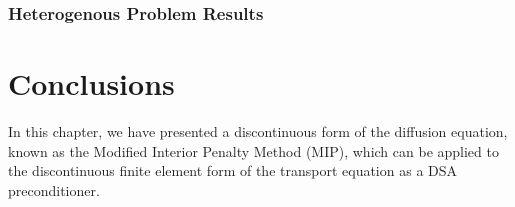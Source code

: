 \subsubsection{Heterogenous Problem Results}
\label{sec::DSA_Results_MIP_Hetero}


\section{Conclusions}
\label{sec::DSA_conclusions}

In this chapter, we have presented a discontinuous form of the diffusion equation, known as the Modified Interior Penalty Method (MIP), which can be applied to the discontinuous finite element form of the transport equation as a DSA preconditioner. 

